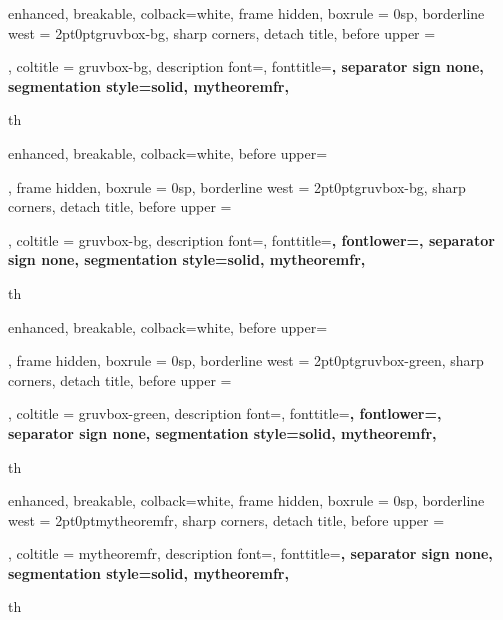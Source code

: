 {
	enhanced,
	breakable,
	colback=white,
	frame hidden,
	boxrule = 0sp,
	borderline west = {2pt}{0pt}{gruvbox-bg},
	sharp corners,
	detach title,
	before upper = \tcbtitle\par\smallskip,
	coltitle = gruvbox-bg,
	description font=\mdseries{}\selectfont,
	fonttitle=\selectfont\bfseries,
	separator sign none,
	segmentation style={solid, mytheoremfr},
}
{th}


{
	enhanced,
	breakable,
	colback=white,
  before upper=\tcbtitle\par\Hugeskip,
	frame hidden,
	boxrule = 0sp,
	borderline west = {2pt}{0pt}{gruvbox-bg},
	sharp corners,
	detach title,
	before upper = \tcbtitle\par\smallskip,
	coltitle = gruvbox-bg,
	description font=\mdseries{}\selectfont,
	fonttitle=\selectfont\bfseries,
	fontlower=\selectfont,
  separator sign none,
	segmentation style={solid, mytheoremfr},
}
{th}

{
	enhanced,
	breakable,
	colback=white,
  before upper=\tcbtitle\par\Hugeskip,
	frame hidden,
	boxrule = 0sp,
	borderline west = {2pt}{0pt}{gruvbox-green},
	sharp corners,
	detach title,
	before upper = \tcbtitle\par\smallskip,
	coltitle = gruvbox-green,
	description font=\mdseries{}\selectfont,
	fonttitle=\selectfont\bfseries,
	fontlower=\selectfont,
  separator sign none,
	segmentation style={solid, mytheoremfr},
}
{th}

{
	enhanced,
	breakable,
	colback=white,
	frame hidden,
	boxrule = 0sp,
	borderline west = {2pt}{0pt}{mytheoremfr},
	sharp corners,
	detach title,
	before upper = \tcbtitle\par\smallskip,
	coltitle = mytheoremfr,
	description font=\selectfont,
	fonttitle=\selectfont\bfseries,
	separator sign none,
	segmentation style={solid, mytheoremfr},
}
{th}



